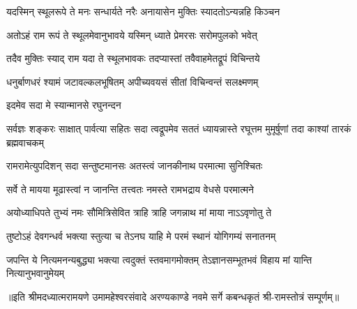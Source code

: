 \twolineshloka
{यदस्मिन् स्थूलरूपे ते मनः सन्धार्यते नरैः}
{अनायासेन मुक्तिः स्यादतोऽन्यन्नहि किञ्चन} %

\twolineshloka
{अतोऽहं राम रूपं ते स्थूलमेवानुभावये}
{यस्मिन् ध्याते प्रेमरसः सरोमपुलको भवेत्} %

\twolineshloka
{तदैव मुक्तिः स्याद् राम यदा ते स्थूलभावकः}
{तदप्यास्तां तवैवाहमेतद्रूपं विचिन्तये} %

\twolineshloka
{धनुर्बाणधरं श्यामं जटावल्कलभूषितम्}
{अपीच्यवयसं सीतां विचिन्वन्तं सलक्ष्मणम्} %

\onelineshloka
{इदमेव सदा मे स्यान्मानसे रघुनन्दन} %


\threelineshloka
{सर्वज्ञः शङ्करः साक्षात् पार्वत्या सहितः सदा}
{त्वद्रूपमेव सततं ध्यायन्नास्ते रघूत्तम}
{मुमूर्षूणां तदा काश्यां तारकं ब्रह्मवाचकम्} %

\twolineshloka
{रामरामेत्युपदिशन् सदा सन्तुष्टमानसः}
{अतस्त्वं जानकीनाथ परमात्मा सुनिश्चितः} %

\twolineshloka
{सर्वे ते मायया मूढास्त्वां न जानन्ति तत्त्वतः}
{नमस्ते रामभद्राय वेधसे परमात्मने} %

\twolineshloka
{अयोध्याधिपते तुभ्यं नमः सौमित्रिसेवित}
{त्राहि त्राहि जगन्नाथ मां माया नाऽऽवृणोतु ते} %


\twolineshloka
{तुष्टोऽहं देवगन्धर्व भक्त्या स्तुत्या च तेऽनघ}
{याहि मे परमं स्थानं योगिगम्यं सनातनम्} %

\fourlineindentedshloka
{जपन्ति ये नित्यमनन्यबुद्ध्या}
{भक्त्या त्वदुक्तं स्तवमागमोक्तम्}
{तेऽज्ञानसम्भूतभवं विहाय}
{मां यान्ति नित्यानुभवानुमेयम्} %

{॥इति श्रीमदध्यात्मरामयणे उमामहेश्वरसंवादे
अरण्यकाण्डे नवमे  सर्गे  कबन्धकृतं  श्री-रामस्तोत्रं  सम्पूर्णम्॥}
